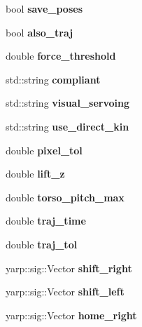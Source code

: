 \begin{DoxyCompactItemize}
\item 
bool {\bfseries save\+\_\+poses}\label{classGraspingModule_a8193f9e7fc2e65f52bf80580735113bc}

\item 
bool {\bfseries also\+\_\+traj}\label{classGraspingModule_ada586ca7d90ea75cf6be9847ddb274c7}

\item 
double {\bfseries force\+\_\+threshold}\label{classGraspingModule_abd2e8eaca9dd18e74a40fd3831922c16}

\item 
std\+::string {\bfseries compliant}\label{classGraspingModule_ad74775f47ff255bde51b0bab79a31728}

\item 
std\+::string {\bfseries visual\+\_\+servoing}\label{classGraspingModule_a79082a891f887dbb9edfed4653451e35}

\item 
std\+::string {\bfseries use\+\_\+direct\+\_\+kin}\label{classGraspingModule_a832c738961170cb80a024805b22464b8}

\item 
double {\bfseries pixel\+\_\+tol}\label{classGraspingModule_aa84058eee1411f35aa489b9cad9f9371}

\item 
double {\bfseries lift\+\_\+z}\label{classGraspingModule_a676c7aa895de03ba5362a309cd669905}

\item 
double {\bfseries torso\+\_\+pitch\+\_\+max}\label{classGraspingModule_af1feeb0f4397d83491831327e05c8b44}

\item 
double {\bfseries traj\+\_\+time}\label{classGraspingModule_a02accb5392fe0877a2a98febbcf20ea6}

\item 
double {\bfseries traj\+\_\+tol}\label{classGraspingModule_a2b59e1c09ae51bb1829cb4b73799a9d2}

\item 
yarp\+::sig\+::\+Vector {\bfseries shift\+\_\+right}\label{classGraspingModule_a589b2e394e0d255fcd23734b911392ef}

\item 
yarp\+::sig\+::\+Vector {\bfseries shift\+\_\+left}\label{classGraspingModule_a96feca3ff9d44e599351ddb1c4497fcf}

\item 
yarp\+::sig\+::\+Vector {\bfseries home\+\_\+right}\label{classGraspingModule_ac43f827abab558d8aea39a6cbcd150a2}


\end{DoxyCompactItemize}
